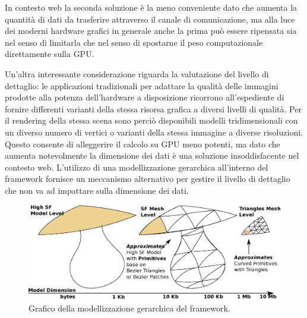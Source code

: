 In contesto web la seconda soluzione \`e la meno conveniente dato che aumenta la quantit\`a di dati da trasferire attraverso il canale di comunicazione, ma alla luce dei moderni hardware grafici in generale anche la prima pu\`o essere ripensata sia nel senso di limitarla che nel senso di spostarne il peso computazionale direttamente sulla \ac{GPU}.

Un'altra interessante considerazione riguarda la valutazione del livello di dettaglio: le applicazioni tradizionali per adattare la qualit\`a delle immagini prodotte alla potenza dell'hardware a disposizione ricorrono all'espediente di fornire differenti varianti della stessa risorsa grafica a diversi livelli di qualit\`a. Per il rendering della stessa scena sono perci\`o disponibili modelli tridimensionali con un diverso numero di vertici o varianti della stessa immagine a diverse risoluzioni. Questo consente di alleggerire il calcolo su \ac{GPU} meno potenti, ma dato che aumenta notevolmente la dimensione dei dati \`e una soluzione insoddisfacente nel contesto web. L'utilizzo di una modellizzazione gerarchica all'interno del framework fornisce un meccanismo alternativo per gestire il livello di dettaglio che non va ad impattare sulla dimensione dei dati.

\begin{figure}
\begin{center}
\includegraphics[width=\textwidth]{Immagini/hierarchicalmodeling}
\caption{Grafico della modellizzazione gerarchica del framework.\label{f:hierarchicalmodeling}} 
\end{center} 
\end{figure}

